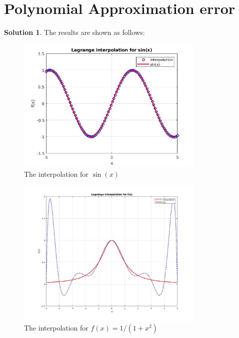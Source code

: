 \documentclass{article}
\theoremstyle{definition}
\newtheorem{solution}{Solution}
\begin{document}
\section{Polynomial Approximation error}
\begin{solution}
  The results are shown as follows:
    \begin{figure}[ht]
      \label{Fig:solution_to_problem5_1}  
      \includegraphics[width=0.8\textwidth]{plot_5_1.jpg}
      \centering
      \caption{The interpolation for $\sin(x)$}
    \end{figure}

    \begin{figure}[ht]
      \label{Fig:solution_to_problem3}
      \includegraphics[width=0.8\textwidth]{plot_5_2.jpg}
      \centering
      \caption{The interpolation for $f(x)=1/(1+x^2)$}
    \end{figure}


\end{solution}
\end{document}
